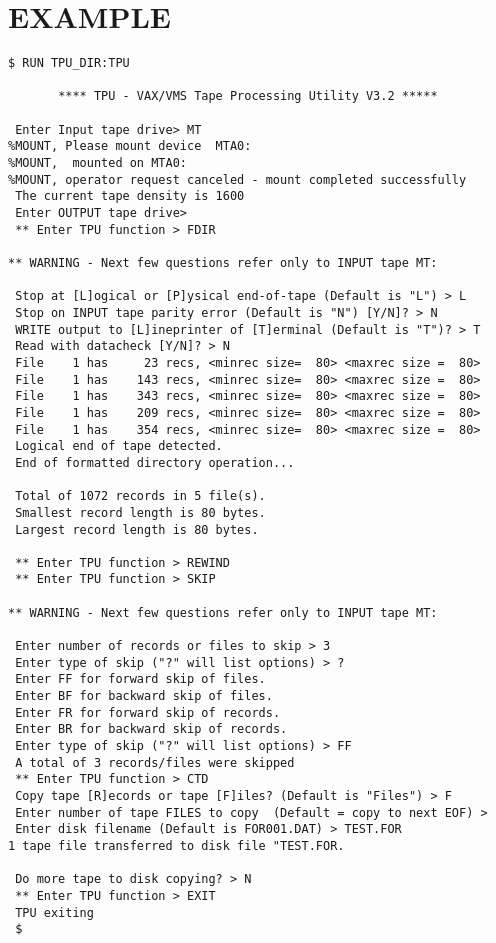 \section{EXAMPLE}
\begin{verbatim}
$ RUN TPU_DIR:TPU

       **** TPU - VAX/VMS Tape Processing Utility V3.2 *****

 Enter Input tape drive> MT
%MOUNT, Please mount device  MTA0:
%MOUNT,  mounted on MTA0:
%MOUNT, operator request canceled - mount completed successfully
 The current tape density is 1600
 Enter OUTPUT tape drive>
 ** Enter TPU function > FDIR

** WARNING - Next few questions refer only to INPUT tape MT:

 Stop at [L]ogical or [P]ysical end-of-tape (Default is "L") > L
 Stop on INPUT tape parity error (Default is "N") [Y/N]? > N
 WRITE output to [L]ineprinter of [T]erminal (Default is "T")? > T
 Read with datacheck [Y/N]? > N
 File    1 has     23 recs, <minrec size=  80> <maxrec size =  80>
 File    1 has    143 recs, <minrec size=  80> <maxrec size =  80>
 File    1 has    343 recs, <minrec size=  80> <maxrec size =  80>
 File    1 has    209 recs, <minrec size=  80> <maxrec size =  80>
 File    1 has    354 recs, <minrec size=  80> <maxrec size =  80>
 Logical end of tape detected.
 End of formatted directory operation...

 Total of 1072 records in 5 file(s).
 Smallest record length is 80 bytes.
 Largest record length is 80 bytes.

 ** Enter TPU function > REWIND
 ** Enter TPU function > SKIP

** WARNING - Next few questions refer only to INPUT tape MT:

 Enter number of records or files to skip > 3
 Enter type of skip ("?" will list options) > ?
 Enter FF for forward skip of files.
 Enter BF for backward skip of files.
 Enter FR for forward skip of records.
 Enter BR for backward skip of records.
 Enter type of skip ("?" will list options) > FF
 A total of 3 records/files were skipped
 ** Enter TPU function > CTD
 Copy tape [R]ecords or tape [F]iles? (Default is "Files") > F
 Enter number of tape FILES to copy  (Default = copy to next EOF) >
 Enter disk filename (Default is FOR001.DAT) > TEST.FOR
1 tape file transferred to disk file "TEST.FOR.

 Do more tape to disk copying? > N
 ** Enter TPU function > EXIT
 TPU exiting
 $

\end{verbatim}


